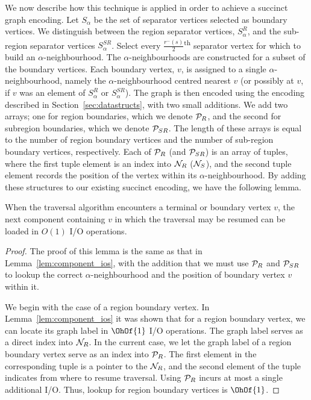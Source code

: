 {We now describe how this technique is applied in order to achieve a succinct graph
encoding. 
Let $S_\alpha$ be the set of separator vertices selected as boundary
vertices.
We distinguish between the region separator vertices, 
$S^{R}_\alpha$, and the sub-region separator vertices $S^{SR}_\alpha$.
Select every $\frac{r^{-}(s)}{2}$\textsuperscript{th} separator vertex 
for which to build an $\alpha$-neighbourhood. 
The $\alpha$-neighbourhoods are constructed for a subset of 
the boundary vertices.
Each boundary vertex, $v$, is assigned to a single $\alpha$-neighbourhood, namely
the $\alpha$-neighbourhood centred nearest $v$ (or possibly at
$v$, if $v$ was an element of $S^{R}_\alpha$ or $S^{SR}_\alpha$). 
The graph is then encoded using the encoding described in 
Section~\ref{sec:datastructs}, with two small additions.
We add two arrays; one for region boundaries, which we denote 
$\mathcal{P}_R$, and the second for subregion boundaries,
which we denote $\mathcal{P}_{SR}$.
The length of these arrays is equal to the number of region boundary 
vertices and the number of sub-region boundary vertices, respectively.
Each of $\mathcal{P}_R$ (and $\mathcal{P}_{SR}$) is an array of tuples, where
the first tuple element is an index into $\mathcal{N}_R$ ($\mathcal{N}_S$), 
and the second tuple element records the position of the vertex within
its $\alpha$-neighbourhood. 
By adding these structures to our existing succinct encoding, we have the
 following lemma.

\begin{lemma}
\label{lem:ptable_ios}
When the traversal algorithm encounters a terminal or boundary
vertex $v$, the next component containing $v$ in which the traversal
may be resumed can be loaded in $O(1)$ I/O operations.
\end{lemma}

\begin{proof}
The proof of this lemma is the same as that in 
Lemma~\ref{lem:component_ios}, with the addition that we must
use $\mathcal{P}_R$ and $\mathcal{P}_{SR}$ to lookup the correct 
$\alpha$-neighbourhood and the position of boundary vertex $v$
within it.

We begin with the case of a region boundary vertex.
In Lemma~\ref{lem:component_ios} it was shown that for a region
boundary vertex, we can locate its graph label in $\OhOf{1}$ I/O
operations.
The graph label serves as a direct index into $\mathcal{N}_R$.
In the current case, we let the graph label of a region boundary
vertex serve as an index into $\mathcal{P}_R$.
The first element in the corresponding tuple is a pointer to the
$\mathcal{N}_R$, and the second element of the tuple indicates from where
to resume traversal.
Using $\mathcal{P}_R$ incurs at most a single additional I/O.
Thus, lookup for region boundary vertices is $\OhOf{1}$.


\end{proof}}
